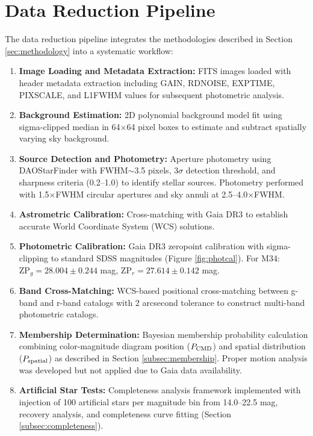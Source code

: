 \documentclass[linenumbers,trackchanges,twocolumn]{aastex701}
\begin{document}
\appendix

\section{Data Reduction Pipeline} \label{app:pipeline}

The data reduction pipeline integrates the methodologies described in Section \ref{sec:methodology} into a systematic workflow:

\begin{enumerate}
\item \textbf{Image Loading and Metadata Extraction:} FITS images loaded with header metadata extraction including GAIN, RDNOISE, EXPTIME, PIXSCALE, and L1FWHM values for subsequent photometric analysis.

\item \textbf{Background Estimation:} 2D polynomial background model fit using sigma-clipped median in 64$\times$64 pixel boxes to estimate and subtract spatially varying sky background.

\item \textbf{Source Detection and Photometry:} Aperture photometry using DAOStarFinder \citep{bradley2020} with FWHM$\sim$3.5 pixels, 3$\sigma$ detection threshold, and sharpness criteria (0.2--1.0) to identify stellar sources. Photometry performed with 1.5$\times$FWHM circular apertures and sky annuli at 2.5--4.0$\times$FWHM.

\item \textbf{Astrometric Calibration:} Cross-matching with Gaia DR3 \citep{gaiadr3} to establish accurate World Coordinate System (WCS) solutions.

\item \textbf{Photometric Calibration:} Gaia DR3 zeropoint calibration with sigma-clipping to standard SDSS magnitudes (Figure \ref{fig:photcal}). For M34: $\text{ZP}_g = 28.004 \pm 0.244$ mag, $\text{ZP}_r = 27.614 \pm 0.142$ mag.

\item \textbf{Band Cross-Matching:} WCS-based positional cross-matching between g-band and r-band catalogs with 2 arcsecond tolerance to construct multi-band photometric catalogs.

\item \textbf{Membership Determination:} Bayesian membership probability calculation combining color-magnitude diagram position ($P_{\rm CMD}$) and spatial distribution ($P_{\rm spatial}$) as described in Section \ref{subsec:membership}. Proper motion analysis was developed but not applied due to Gaia data availability.

\item \textbf{Artificial Star Tests:} Completeness analysis framework implemented with injection of 100 artificial stars per magnitude bin from 14.0--22.5 mag, recovery analysis, and completeness curve fitting (Section \ref{subsec:completeness}).
\end{enumerate}
\end{document}
